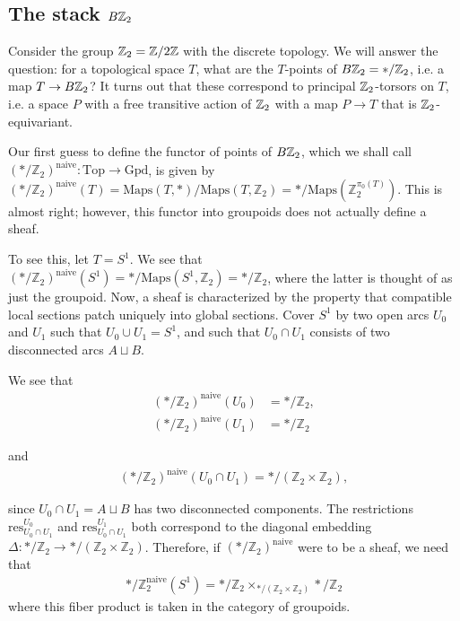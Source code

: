 \documentclass[12pt]{article}
\begin{document}
\subsection{The stack $B\mathbb{Z}_2$}
Consider the group $\mathbb{Z}_2 = \mathbb{Z}/2\mathbb{Z}$ with the discrete topology. We will answer the question: for a topological space $T$, what are the $T$-points of $B\mathbb{Z}_2 = */\mathbb{Z}_2$, i.e. a map $T \to B\mathbb{Z}_2$? It turns out that these correspond to principal $\mathbb{Z}_2$-torsors on $T$, i.e. a space $P$ with a free transitive action of $\mathbb{Z}_2$ with a map $P \to T$ that is $\mathbb{Z}_2$-equivariant.

Our first guess to define the functor of points of $B\mathbb{Z}_2$, which we shall call $(*/\mathbb{Z}_2)^{\text{naive}} : \text{Top} \to \text{Gpd}$, is given by
$(*/\mathbb{Z}_2)^{\text{naive}}(T) = \text{Maps}(T, *)/\text{Maps}(T, \mathbb{Z}_2) = */\text{Maps}(\mathbb{Z}_2^{\pi_0(T)})$. This is almost right; however, this functor into groupoids does not actually define a sheaf.

To see this, let $T = S^1$. We see that $(*/\mathbb{Z}_2)^{\text{naive}}(S^1) = */\text{Maps}(S^1, \mathbb{Z}_2) = */\mathbb{Z}_2$, where the latter is thought of as just the groupoid. Now, a sheaf is characterized by the property that compatible local sections patch uniquely into global sections. Cover $S^1$ by two open arcs $U_0$ and $U_1$
such that $U_0 \cup U_1 = S^1$, and such that $U_0 \cap U_1$ consists of two disconnected arcs $A \sqcup B$.

We see that
\begin{align}
    (*/\mathbb{Z}_2)^{\text{naive}}(U_0) & = */\mathbb{Z}_2, \\
    (*/\mathbb{Z}_2)^{\text{naive}}(U_1) & = */\mathbb{Z}_2
\end{align}

and
\begin{align}
    (*/\mathbb{Z}_2)^{\text{naive}}(U_0 \cap U_1) = */(\mathbb{Z}_2 \times \mathbb{Z}_2),
\end{align}

since $U_0 \cap U_1 = A \sqcup B$ has two disconnected components. The restrictions $\text{res}_{U_0 \cap U_1}^{U_0}$ and
$\text{res}_{U_0 \cap U_1}^{U_1}$ both correspond to the diagonal embedding $\Delta : */\mathbb{Z}_2 \to */(\mathbb{Z}_2 \times \mathbb{Z}_2)$. Therefore, if $(*/\mathbb{Z}_2)^{\text{naive}}$ were to be a sheaf, we need that \begin{align*}
    */\mathbb{Z}_2^{\text{naive}}(S^1) = */\mathbb{Z}_2 \times_{*/(\mathbb{Z}_2 \times \mathbb{Z}_2)} */\mathbb{Z}_2
\end{align*} where this fiber product is taken in the category of groupoids.
\end{document}
